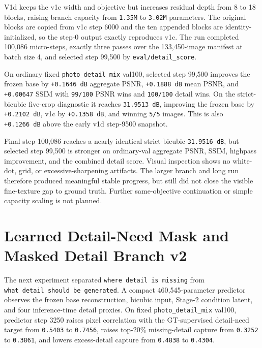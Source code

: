 \documentclass[
  10pt,
]{article}
\begin{document}
V1d keeps the v1c width and objective but increases residual depth from
8 to 18 blocks, raising branch capacity from \texttt{1.35M} to
\texttt{3.02M} parameters. The original blocks are copied from v1c step
6000 and the ten appended blocks are identity-initialized, so the step-0
output exactly reproduces v1c. The run completed 100,086 micro-steps,
exactly three passes over the 133,450-image manifest at batch size 4,
and selected step 99,500 by \texttt{eval/detail\_score}.

On ordinary fixed \texttt{photo\_detail\_mix} val100, selected step
99,500 improves the frozen base by \texttt{+0.1646\ dB} aggregate PSNR,
\texttt{+0.1888\ dB} mean PSNR, and \texttt{+0.00647} SSIM with
\texttt{99/100} PSNR wins and \texttt{100/100} detail wins. On the
strict-bicubic five-crop diagnostic it reaches \texttt{31.9513\ dB},
improving the frozen base by \texttt{+0.2102\ dB}, v1c by
\texttt{+0.1358\ dB}, and winning \texttt{5/5} images. This is also
\texttt{+0.1266\ dB} above the early v1d step-9500 snapshot.

Final step 100,086 reaches a nearly identical strict-bicubic
\texttt{31.9516\ dB}, but selected step 99,500 is stronger on
ordinary-val aggregate PSNR, SSIM, highpass improvement, and the
combined detail score. Visual inspection shows no white-dot, grid, or
excessive-sharpening artifacts. The larger branch and long run therefore
produced meaningful stable progress, but still did not close the visible
fine-texture gap to ground truth. Further same-objective continuation or
simple capacity scaling is not planned.

\hypertarget{learned-detail-need-mask-and-masked-detail-branch-v2}{%
\section{Learned Detail-Need Mask and Masked Detail Branch
v2}\label{learned-detail-need-mask-and-masked-detail-branch-v2}}

The next experiment separated \texttt{where\ detail\ is\ missing} from
\texttt{what\ detail\ should\ be\ generated}. A compact
460,545-parameter predictor observes the frozen base reconstruction,
bicubic input, Stage-2 condition latent, and four inference-time detail
proxies. On fixed \texttt{photo\_detail\_mix} val100, predictor step
3250 raises pixel correlation with the GT-supervised detail-need target
from \texttt{0.5403} to \texttt{0.7456}, raises top-20\% missing-detail
capture from \texttt{0.3252} to \texttt{0.3861}, and lowers
excess-detail capture from \texttt{0.4838} to \texttt{0.4304}.
\end{document}
